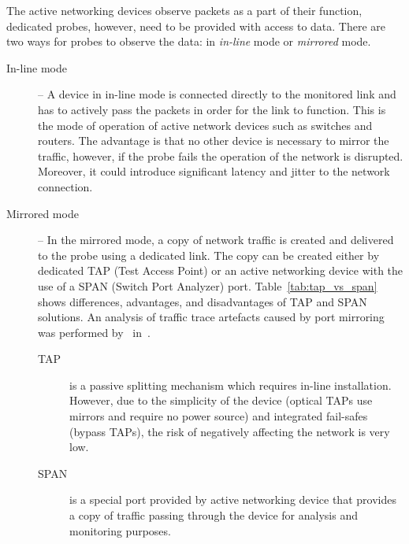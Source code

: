 The active networking devices observe packets as a part of their function, dedicated probes, however, need to be provided with access to data. There are two ways for probes to observe the data: in \emph{in-line} mode or \emph{mirrored} mode.
\begin{description}
    \item[In-line mode] -- A device in in-line mode is connected directly to the monitored link and has to actively pass the packets in order for the link to function. This is the mode of operation of active network devices such as switches and routers. The advantage is that no other device is necessary to mirror the traffic, however, if the probe fails the operation of the network is disrupted. Moreover, it could introduce significant latency and jitter to the network connection.
    \item[Mirrored mode] -- In the mirrored mode, a copy of network traffic is created and delivered to the probe using a dedicated link. The copy can be created either by dedicated TAP (Test Access Point) or an active networking device with the use of a SPAN (Switch Port Analyzer) port. Table~\ref{tab:tap_vs_span} shows differences, advantages, and disadvantages of TAP and SPAN solutions. An analysis of traffic trace artefacts caused by port mirroring was performed by~\citeauthor{Zhang-2007-Traffic} in~\cite{Zhang-2007-Traffic}.
    \begin{description}
        \item[TAP] is a passive splitting mechanism which requires in-line installation. However, due to the simplicity of the device (optical TAPs use mirrors and require no power source) and integrated fail-safes (bypass TAPs), the risk of negatively affecting the network is very low. 
        \item[SPAN] is a special port provided by active networking device that provides a copy of traffic passing through the device for analysis and monitoring purposes.
    \end{description}
\end{description}

